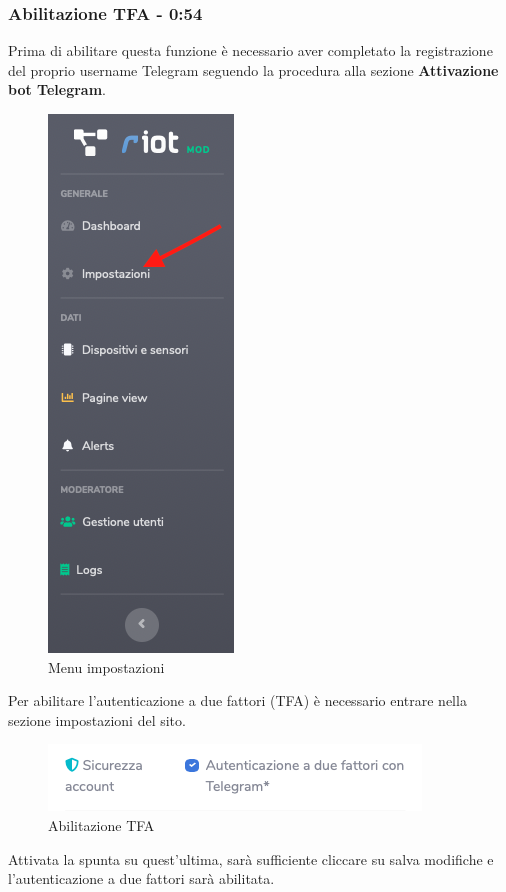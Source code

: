 	\subsubsection{Abilitazione TFA - 0:54}
	Prima di abilitare questa funzione è necessario aver completato la registrazione del proprio username Telegram seguendo la procedura alla sezione \textbf{Attivazione bot Telegram}.
	\begin{figure}[H]
		\centering
		\includegraphics[scale=0.600]{res/images/membro/menuImp.png}
		\caption{Menu impostazioni}
	\end{figure}	
	Per abilitare l'autenticazione a due fattori (TFA) è necessario entrare nella sezione impostazioni del sito.
	\begin{figure}[H]
		\centering
		\includegraphics[scale=0.600]{res/images/membro/TFAAbilitato.png}
		\caption{Abilitazione TFA}
	\end{figure}
	Attivata la spunta su quest'ultima, sarà sufficiente cliccare su salva modifiche e l'autenticazione a due fattori sarà abilitata.



